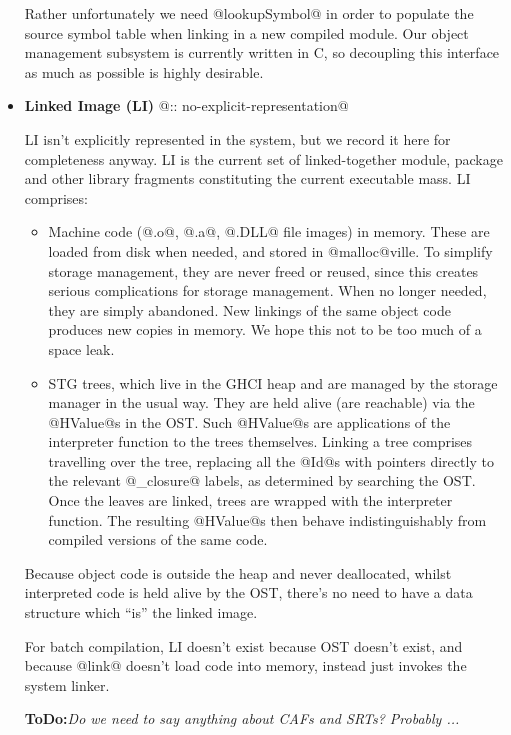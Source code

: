 \documentclass[11pt]{article}
\newcommand{\ToDo}[1]{{{\bf ToDo:}\sl #1}}
\begin{document}
\begin{itemize}
  Rather unfortunately we need @lookupSymbol@ in order to populate the
  source symbol table when linking in a new compiled module.  Our
  object management subsystem is currently written in C, so decoupling
  this interface as much as possible is highly desirable.

\item
   {\bf Linked Image (LI)} @:: no-explicit-representation@

   LI isn't explicitly represented in the system, but we record it
   here for completeness anyway.  LI is the current set of
   linked-together module, package and other library fragments
   constituting the current executable mass.  LI comprises:
   \begin{itemize}
   \item Machine code (@.o@, @.a@, @.DLL@ file images) in memory.
         These are loaded from disk when needed, and stored in
         @malloc@ville.  To simplify storage management, they are
         never freed or reused, since this creates serious
         complications for storage management.  When no longer needed,
         they are simply abandoned.  New linkings of the same object
         code produces new copies in memory.  We hope this not to be
         too much of a space leak.
   \item STG trees, which live in the GHCI heap and are managed by the
         storage manager in the usual way.  They are held alive (are 
         reachable) via the @HValue@s in the OST.  Such @HValue@s are
         applications of the interpreter function to the trees
         themselves.  Linking a tree comprises travelling over the 
         tree, replacing all the @Id@s with pointers directly to the
         relevant @_closure@ labels, as determined by searching the
         OST.  Once the leaves are linked, trees are wrapped with the
         interpreter function.  The resulting @HValue@s then behave
         indistinguishably from compiled versions of the same code.
   \end{itemize}
   Because object code is outside the heap and never deallocated,
   whilst interpreted code is held alive by the OST, there's no need
   to have a data structure which ``is'' the linked image.

   For batch compilation, LI doesn't exist because OST doesn't exist,
   and because @link@ doesn't load code into memory, instead just
   invokes the system linker.

   \ToDo{Do we need to say anything about CAFs and SRTs?  Probably ...}
\end{itemize}
\end{document}
